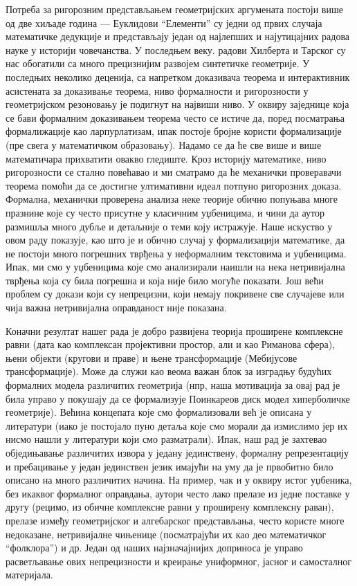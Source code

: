 Потреба за ригорозним представљањем геометријских аргумената постоји
више од две хиљаде година --- Еуклидови ``Елементи'' су једни од првих
случаја математичке дедукције и представљају један од најлепших и
најутицајних радова науке у историји човечанства. У последњем
веку. радови Хилберта \cite{hilbert} и Тарског \cite{tarski} су нас
обогатили са много прецизнијим развојем синтетичке геометрије. У
последњих неколико деценија, са напретком доказивача теорема и
интерактивник асистената за доказивање теорема, ниво формалности и
ригорозности у геометријском резоновању је подигнут на највиши ниво. У
оквиру заједнице која се бави формалним доказивањем теорема често се
истиче да, поред посматрања формалижације као ларпурлатизам, ипак
постоје бројне користи формализације (пре свега у математичком
образовању). Надамо се да ће све више и више математичара прихватити
овакво гледиште. Кроз историју математике, ниво ригорозности се стално
повећавао и ми сматрамо да ће механички проверавачи теорема помоћи да
се достигне ултимативни идеал потпуно ригорозних доказа. Формална,
механички проверена анализа неке теорије обично попуњава многе
празнине које су често присутне у класичним уџбеницима, и чини да
аутор размишља много дубље и детаљније о теми коју истражује. Наше
искуство у овом раду показује, као што је и обично случај у
формализацији математике, да не постоји много погрешних тврђења у
неформалним текстовима и уџбеницима. Ипак, ми смо у уџбеницима које
смо анализирали наишли на нека нетривијална тврђења која су била
погрешна и која није било могуће показати. Још већи проблем су докази
који су непрецизни, који немају покривене све случајеве или чија важна
нетривијална оправданост није показана.

Коначни резултат нашег рада је добро развијена теорија проширене
комплексне равни (дата као комплексан пројективни простор, али и као
Риманова сфера), њени објекти (кругови и праве) и њене трансформације
(Мебијусове трансформације). Може да служи као веома важан блок за
изградњу будућих формалних модела различитих геометрија (нпр, наша
мотивација за овај рад је била управо у покушају да се формализује
Поинкареов диск модел хиперболичке геометрије). Већина концепата које
смо формализовали већ је описана у литератури (иако је постојало пуно
детаља које смо морали да измислимо јер их нисмо нашли у литератури
који смо разматрали). Ипак, наш рад је захтевао обједињавање
различитих извора у једану јединствену, формалну репрезентацију и
пребацивање у један јединствен језик имајући на уму да је првобитно
било описано на много различитих начина. На пример, чак и у оквиру
истог уџбеника, без икаквог формалног оправдања, аутори често лако
прелазе из једне поставке у другу (рецимо, из обичне комплексне равни
у проширену комплексну раван), прелазе између геометријског и
алгебарског представљања, често користе многе недоказане, нетривијалне
чињенице (посматрајући их као део математичког ``фолклора'') и
др. Један од наших најзначајнијих доприноса је управо расветљавање
ових непрецизности и креирање униформног, јасног и самосталног
материјала.

